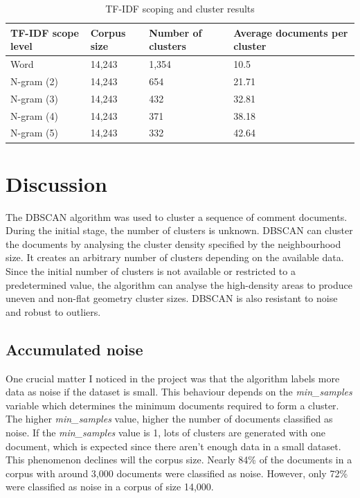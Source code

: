 \documentclass[conference]{IEEEtran}
\begin{document}
\begin{table}[!h]
\renewcommand{\arraystretch}{1.3}

\caption{TF-IDF scoping and cluster results}
\label{table_example}
\centering
\begin{tabular}{|P{1cm}|P{2cm}|P{2cm}|P{2cm}|}
\hline
 \bfseries TF-IDF scope level & \bfseries Corpus size & \bfseries Number of clusters & \bfseries Average documents per cluster\\
 \hline
 Word & 14,243 & 1,354 & 10.5\\
 \hline
 N-gram (2) & 14,243 & 654 & 21.71\\
 \hline 
 N-gram (3) & 14,243 & 432 & 32.81\\
 \hline
 N-gram (4) & 14,243 & 371 & 38.18\\
 \hline
 N-gram (5) & 14,243 & 332 & 42.64\\
 \hline
\end{tabular}
\end{table}

\section{Discussion}

The DBSCAN algorithm was used to cluster a sequence of comment documents. During the initial stage, the number of clusters is unknown. DBSCAN can cluster the documents by analysing the cluster density specified by the neighbourhood size. It creates an arbitrary number of clusters depending on the available data. Since the initial number of clusters is not available or restricted to a predetermined value, the algorithm can analyse the high-density areas to produce uneven and non-flat geometry cluster sizes. DBSCAN is also resistant to noise and robust to outliers. \cite{scikit-learn}

\subsection{Accumulated noise}

One crucial matter I noticed in the project was that the algorithm labels more data as noise if the dataset is small. This behaviour depends on the \textit{min\_samples} variable which determines the minimum documents required to form a cluster. The higher \textit{min\_samples} value, higher the number of documents classified as noise. If the \textit{min\_samples} value is 1, lots of clusters are generated with one document, which is expected since there aren't enough data in a small dataset. This phenomenon declines will the corpus size. Nearly 84\% of the documents in a corpus with around 3,000 documents were classified as noise. However, only 72\% were classified as noise in a corpus of size 14,000. 
\end{document}
